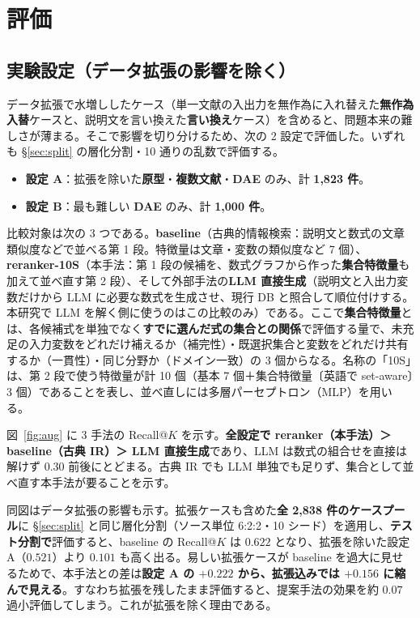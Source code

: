 \documentclass[a4j,dvipdfmx,12pt]{jresume}
\begin{document}
\section{評価}\label{sec:eval}

\subsection{実験設定（データ拡張の影響を除く）}\label{sec:setting}
データ拡張で水増ししたケース（単一文献の入出力を無作為に入れ替えた\textbf{無作為入替}ケースと、説明文を言い換えた\textbf{言い換え}ケース）を含めると、問題本来の難しさが薄まる。そこで影響を切り分けるため、次の 2 設定で評価した。いずれも \S\ref{sec:split} の層化分割・10 通りの乱数で評価する。

\begin{itemize}[leftmargin=1.5em]
  \item \textbf{設定 A}：拡張を除いた\textbf{原型}・\textbf{複数文献}・\textbf{DAE} のみ、計 \textbf{1{,}823 件}。
  \item \textbf{設定 B}：最も難しい \textbf{DAE} のみ、計 \textbf{1{,}000 件}。
\end{itemize}

比較対象は次の 3 つである。\textbf{baseline}（古典的情報検索：説明文と数式の文章類似度などで並べる第 1 段。特徴量は文章・変数の類似度など 7 個）、\textbf{reranker-10S}（本手法：第 1 段の候補を、数式グラフから作った\textbf{集合特徴量}も加えて並べ直す第 2 段）、そして外部手法の\textbf{LLM 直接生成}（説明文と入出力変数だけから LLM に必要な数式を生成させ、現行 DB と照合して順位付けする。本研究で LLM を解く側に使うのはこの比較のみ）である。ここで\textbf{集合特徴量}とは、各候補式を単独でなく\textbf{すでに選んだ式の集合との関係}で評価する量で、未充足の入力変数をどれだけ補えるか（補完性）・既選択集合と変数をどれだけ共有するか（一貫性）・同じ分野か（ドメイン一致）の 3 個からなる。名称の「10S」は、第 2 段で使う特徴量が計 10 個（基本 7 個＋集合特徴量〔英語で set-aware〕3 個）であることを表し、並べ直しには多層パーセプトロン（MLP）を用いる。

図~\ref{fig:aug} に 3 手法の Recall@$K$ を示す。\textbf{全設定で reranker（本手法）＞ baseline（古典 IR）＞ LLM 直接生成}であり、LLM は数式の組合せを直接は解けず $0.30$ 前後にとどまる。古典 IR でも LLM 単独でも足りず、集合として並べ直す本手法が要ることを示す。

\noindent 同図はデータ拡張の影響も示す。拡張ケースも含めた\textbf{全 2{,}838 件のケースプール}に \S\ref{sec:split} と同じ層化分割（ソース単位 6:2:2・10 シード）を適用し、\textbf{テスト分割で}評価すると、baseline の Recall@$K$ は $0.622$ となり、拡張を除いた設定 A（$0.521$）より $0.101$ も高く出る。易しい拡張ケースが baseline を過大に見せるためで、本手法との差は\textbf{設定 A の $+0.222$ から、拡張込みでは $+0.156$ に縮んで見える}。すなわち拡張を残したまま評価すると、提案手法の効果を約 $0.07$ 過小評価してしまう。これが拡張を除く理由である。
\end{document}
